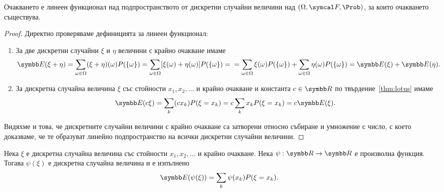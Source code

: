 \documentclass[numbers=endperiod, bibliography=totocnumbered]{scrartcl}
\begin{document}
\begin{proposition}\label{thm:expectation_is_linear_linear}
  Очакването е линеен функционал над подпространството от дискретни случайни величини над \( (\Omega, \F, \Prob) \), за които очакването съществува.
\end{proposition}
\begin{proof}
  Директно проверяваме дефиницията за линеен функционал:
  \begin{enumerate}
    \item За две дискретни случайни \( \xi \) и \( \eta \) величини с крайно очакване имаме
    \begin{equation*}
      \Expect(\xi + \eta)
      =
      \sum_{\omega \in \Omega} (\xi + \eta) (\omega) P(\{ \omega \})
      =
      \sum_{\omega \in \Omega} [\xi (\omega) + \eta (\omega)] P(\{ \omega \})
      = \\ =
      \sum_{\omega \in \Omega} \xi (\omega) P(\{ \omega \}) + \sum_{\omega \in \Omega} \eta (\omega) P(\{ \omega \})
      =
      \Expect(\xi) + \Expect(\eta).
    \end{equation*}

    \item За дискретна случайна величина \( \xi \) със стойности \( x_1, x_2, \ldots \) и крайно очакване и константа \( c \in \R \) по твърдение~\ref{thm:lotus} имаме
    \begin{equation*}
      \Expect(c \xi)
      =
      \sum_k (c x_k) P(\xi = x_k)
      =
      c \sum_k x_k P(\xi = x_k)
      =
      c \Expect(\xi).
    \end{equation*}
  \end{enumerate}

  Видяхме и това, че дискретните случайни величини с крайно очакване са затворени относно събиране и умножение с число, с което доказваме, че те образуват линейно подпространство на всички дискретни случайни величини.
\end{proof}

\begin{proposition}\label{thm:lotus}
  Нека \( \xi \) е дискретна случайна величина със стойности \( x_1, x_2, \ldots \) и крайно очакване. Нека \( \psi: \R \to \R \) е произволна функция. Тогава \( \psi(\xi) \) е дискретна случайна величина и е изпълнено
  \begin{equation*}
    \Expect(\psi(\xi))
    =
    \sum_k \psi(x_k) P(\xi = x_k).
  \end{equation*}
\end{proposition}
\end{document}
